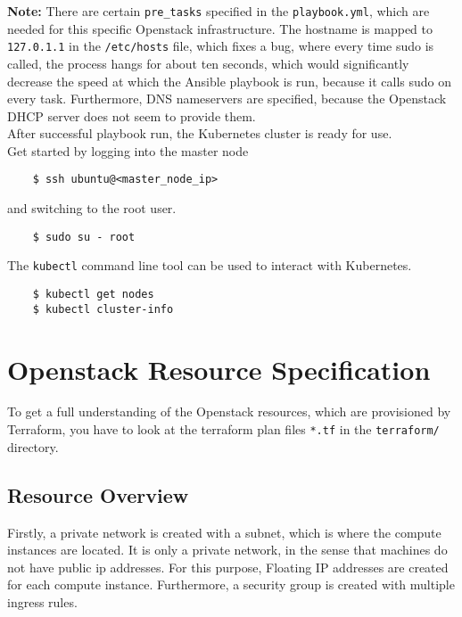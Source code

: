 \noindent
\textbf{Note:} There are certain \verb|pre_tasks| specified in the
\verb|playbook.yml|, which are needed for this specific 
Openstack infrastructure. The hostname is mapped to \verb|127.0.1.1| 
in the \verb|/etc/hosts| file, which fixes a bug, where
every time sudo is called, the process hangs for about ten seconds,
which would significantly decrease the speed at which the 
Ansible playbook is run, because it calls sudo on every task. 
Furthermore, DNS nameservers are specified, because the Openstack DHCP server
does not seem to provide them. \\

\noindent
After successful playbook run, the Kubernetes cluster is ready for use. \\

\noindent
Get started by logging into the master node

\begin{verbatim}
	$ ssh ubuntu@<master_node_ip>
\end{verbatim}

\noindent
and switching to the root user.

\begin{verbatim}
	$ sudo su - root
\end{verbatim}

\noindent
The \verb|kubectl| command line tool can be used to interact with Kubernetes.

\begin{verbatim}
	$ kubectl get nodes
	$ kubectl cluster-info
\end{verbatim}

\section{Openstack Resource Specification}
To get a full understanding of the Openstack resources, 
which are provisioned by Terraform,
you have to look at the terraform plan files \verb|*.tf| in the
\verb|terraform/| directory.

\subsection{Resource Overview}
Firstly, a private network is created with a subnet,
which is where the compute instances are located. It is only a private network,
in the sense that machines do not have public ip addresses. For this purpose,
Floating IP addresses are created for each compute instance. Furthermore,
a security group is created with multiple ingress rules. 

